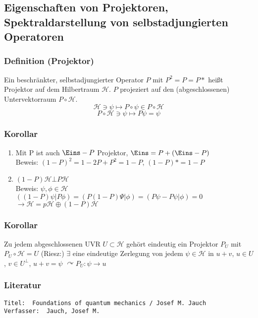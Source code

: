 \documentclass[twoside,a4paper]{scrartcl}
\renewcommand{\1}{\mathds{1}}
\newcommand{\ra}{\rightarrow}
\begin{document}
\subsection{Eigenschaften von Projektoren, Spektraldarstellung von selbstadjungierten Operatoren}
\subsubsection*{Definition (Projektor)}
Ein beschränkter, selbstadjungierter Operator $P$ mit $P^2=P=P*$ heißt Projektor auf dem Hilbertraum $\mathcal H$. $P$ projeziert auf den (abgeschlossenen) Untervektorraum $P \circ  \mathcal H$.
$$\mathcal H \ni \psi \mapsto P \circ \psi \in P \circ \mathcal H$$
$$P\circ \mathcal H \ni \psi \mapsto  P\psi=\psi$$
\subsubsection*{Korollar}
\begin{enumerate}
 \item Mit P ist auch $\Eins-P$ Projektor, $\Eins=P+(\Eins-P)$\\
Beweis: $(1-P)^2=1-2P+P^2=1-P$, $(1-P)*=1-P$
 \item $(1-P) \mathcal H \bot P \mathcal H$\\
Beweis: $\psi,\phi \in \mathcal H$\\
$((1-P)\psi|P\phi)=(P(1-P)\Psi|\phi)=(P\psi-P\psi|\phi)=0$\\
$\ra \mathcal H = p \mathcal H \oplus (1-P)\mathcal H$
\end{enumerate}
\subsubsection*{Korollar}
Zu jedem abgeschlossenen UVR $U \subset \mathcal H$ gehört eindeutig ein Projektor
$P_U$ mit $P_U \circ \mathcal H=U$
(Riesz:) $\exists$ eine eindeutige Zerlegung von jedem $\psi \in \mathcal H$ in $u+v$, $u \in U$, $v \in U^\bot$, $u+v=\psi$
$\curvearrowright P_U: \psi \ra u$ 
\subsubsection*{Literatur}
\begin{tiny}
\begin{verbatim}
Titel: 	Foundations of quantum mechanics / Josef M. Jauch
Verfasser: 	Jauch, Josef M.
\end{verbatim}
\end{tiny}
\end{document}

